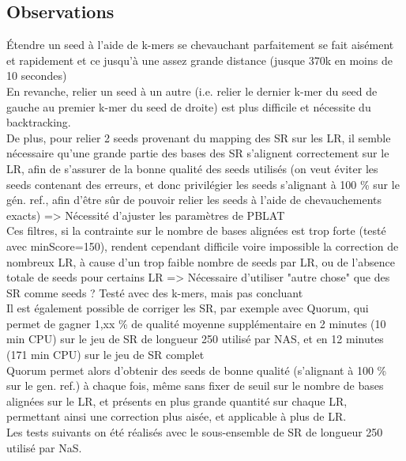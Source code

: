 \documentclass[12pt]{article}
\begin{document}
\subsection{Observations}

Étendre un seed à l'aide de k-mers se chevauchant parfaitement se fait aisément et rapidement et ce jusqu'à une assez grande distance (jusque 370k en moins de 10 secondes) \\

En revanche, relier un seed à un autre (i.e. relier le dernier k-mer du seed de gauche au premier k-mer du seed de droite) est plus difficile et nécessite du backtracking. \\

De plus, pour relier 2 seeds provenant du mapping des SR sur les LR, il semble nécessaire qu'une grande partie des bases des SR s'alignent correctement sur 
le LR, afin de s'assurer de la bonne qualité des seeds utilisés (on veut éviter les seeds contenant des erreurs, et donc privilégier les seeds s'alignant à 100 \% sur le gén. ref., afin d'être sûr de pouvoir relier les seeds à l'aide de chevauchements exacts) => Nécessité d'ajuster les paramètres de PBLAT \\

Ces filtres, si la contrainte sur le nombre de bases alignées est trop forte (testé avec minScore=150), rendent cependant difficile voire impossible la correction de nombreux LR, à cause d'un trop faible nombre de seeds par LR, ou de l'absence totale de seeds pour certains LR => Nécessaire d'utiliser "autre chose" que des SR comme seeds ? Testé avec des k-mers, mais pas concluant \\

Il est également possible de corriger les SR, par exemple avec Quorum, qui permet de gagner 1,xx \% de qualité moyenne supplémentaire en 2 minutes (10 min CPU) sur le jeu de SR de longueur 250 utilisé par NAS, et en 12 minutes (171 min CPU) sur le jeu de SR complet \\
Quorum permet alors d'obtenir des seeds de bonne qualité (s'alignant à 100 \% sur le gen. ref.) à chaque fois, même sans fixer de seuil sur le nombre de bases alignées sur le LR, et présents en plus grande quantité sur chaque LR, permettant ainsi une correction plus aisée, et applicable à plus de LR. \\ 

Les tests suivants on été réalisés avec le sous-ensemble de SR de longueur 250 utilisé par NaS. \\
\end{document}

